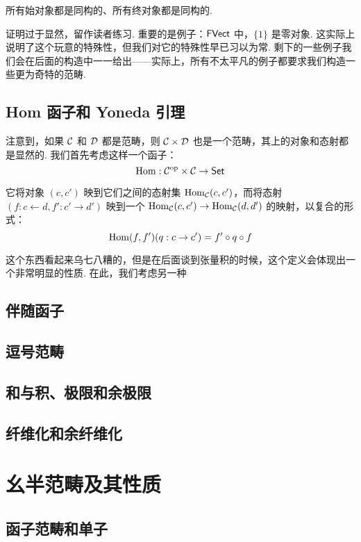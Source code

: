 \begin{theorem}{}{}
    所有始对象都是同构的、所有终对象都是同构的.
\end{theorem}

证明过于显然，留作读者练习. 重要的是例子：$\mathsf{FVect}$ 中，$\{1\}$ 是零对象. 这实际上说明了这个玩意的特殊性，但我们对它的特殊性早已习以为常. 剩下的一些例子我们会在后面的构造中一一给出——实际上，所有不太平凡的例子都要求我们构造一些更为奇特的范畴.

\subsection{Hom 函子和 Yoneda 引理}

注意到，如果 $\mathcal{C}$ 和 $\mathcal{D}$ 都是范畴，则 $\mathcal{C} \times \mathcal{D}$ 也是一个范畴，其上的对象和态射都是显然的. 我们首先考虑这样一个函子：
\[
    \operatorname{Hom}: \mathcal{C}^\mathrm{op} \times \mathcal{C} \to \mathsf{Set}
\]

它将对象 $(c, c')$ 映到它们之间的态射集 $\operatorname{Hom}_{\mathcal{C}}(c, c')$，而将态射 $(f: c \leftarrow d, f': c' \to d')$ 映到一个 $\operatorname{Hom}_{\mathcal{C}}(c, c') \to \operatorname{Hom}_{\mathcal{C}}(d, d')$ 的映射，以复合的形式：
\[
    \operatorname{Hom}(f, f')(q: c \to c') = f' \circ q \circ f
\]

这个东西看起来乌七八糟的，但是在后面谈到张量积的时候，这个定义会体现出一个非常明显的性质. 在此，我们考虑另一种

\subsection{伴随函子}

\subsection{逗号范畴}

\subsection{和与积、极限和余极限}

\subsection{纤维化和余纤维化}

\section{幺半范畴及其性质}

\subsection{函子范畴和单子}

